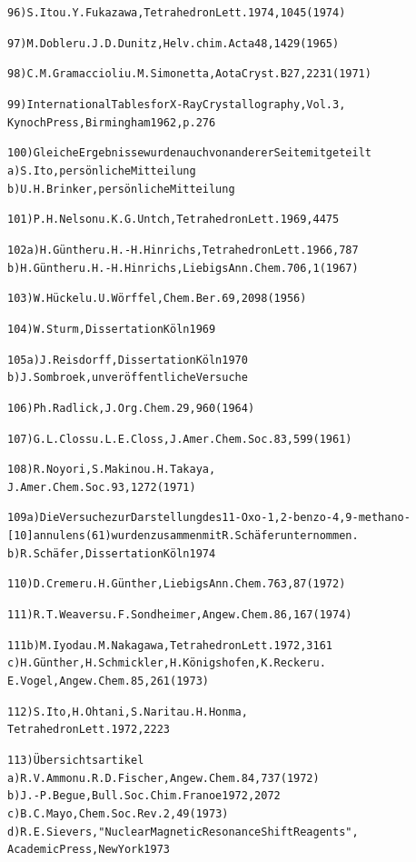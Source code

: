 \documentclass[a4paper,11pt]{article}
\begin{document}
\begin{alltt}
 96)   S.Ito u. Y.Fukazawa, Tetrahedron Lett. 1974, 1045 (1974)

 97)   M.Dobler u. J.D.Dunitz, Helv.chim.Acta 48, 1429 (1965)

 98)   C.M.Gramaccioli u. M.Simonetta, Aota Cryst. B27, 2231 (1971)

 99)   International Tables for X-Ray Crystallography, Vol. 3,
       Kynoch Press, Birmingham 1962, p. 276

100)   Gleiche Ergebnisse wurden auch von anderer Seite mitgeteilt
    a) S.Ito, persönliche Mitteilung
    b) U.H.Brinker, persönliche Mitteilung

101)   P.H.Nelson u. K.G.Untch, Tetrahedron Lett. 1969, 4475

102 a) H.Günther u. H.-H.Hinrichs, Tetrahedron Lett. 1966, 787
    b) H.Günther u. H.-H.Hinrichs, Liebigs Ann.Chem. 706, 1 (1967)

103)   W.Hückel u. U.Wörffel, Chem.Ber. 69, 2098 (1956)

104)   W.Sturm, Dissertation Köln 1969

105 a) J.Reisdorff, Dissertation Köln 1970
    b) J.Sombroek, unveröffentliche Versuche

106)   Ph.Radlick, J.Org.Chem. 29, 960 (1964)

107)   G.L.Closs u. L.E.Closs, J.Amer.Chem.Soc. 83, 599 (1961)

108)   R.Noyori, S.Makino u. H.Takaya,
       J.Amer.Chem.Soc. 93, 1272 (1971)

109 a) Die Versuche zur Darstellung des 11-Oxo-1,2-benzo-4,9-methano-
       [10]annulens (61) wurden zusammen mit R.Schäfer unternommen.
    b) R.Schäfer, Dissertation Köln 1974

110)   D.Cremer u. H.Günther, Liebigs Ann.Chem. 763, 87 (1972)

111)   R.T.Weavers u. F.Sondheimer, Angew.Chem. 86, 167 (1974)
\newpage
{}


111 b) M.Iyoda u. M.Nakagawa, Tetrahedron Lett. 1972, 3161
    c) H.Günther, H.Schmickler, H.Königshofen, K.Recker u.
       E.Vogel, Angew.Chem. 85, 261 (1973)

112)   S.Ito, H.Ohtani, S.Narita u. H.Honma,
       Tetrahedron Lett. 1972, 2223

113)   Übersichtsartikel
    a) R.V.Ammon u. R.D.Fischer, Angew.Chem. 84, 737 (1972)
    b) J.-P.Begue, Bull.Soc.Chim.Franoe 1972, 2072
    c) B.C.Mayo, Chem.Soc.Rev. 2, 49 (1973)
    d) R.E.Sievers, "Nuclear Magnetic Resonance Shift Reagents",
       Academic Press, New York 1973


\end{alltt}
\end{document}
